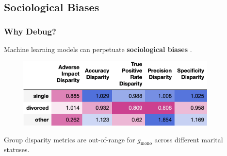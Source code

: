 \documentclass[11pt,
               aspectratio=43,
               hyperref={colorlinks}
               ]{beamer}
\begin{document}
		\subsection{Sociological Biases}
	
			\begin{frame}[label={slide:disp}]
		
				\frametitle{Why Debug?}
		
				\footnotesize{Machine learning models can perpetuate \textbf{sociological biases} \cite{barocas-hardt-narayanan}.}
				\vspace{10pt}	
				\begin{figure}
					\begin{center}
						\includegraphics[height=100pt]{img/di.png}
					\end{center}
				\end{figure}
				\scriptsize{Group disparity metrics are out-of-range for $g_{\text{mono}}$ across different marital statuses.}
				\normalsize
		
			\end{frame}
	
\end{document}
